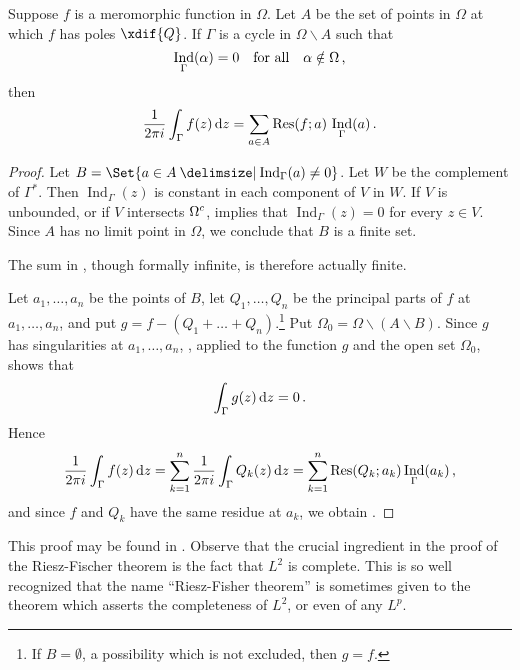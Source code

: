 \documentclass[12pt]{CrispyNotes}
\DeclareMathOperator{\Ind}{Ind}
\DeclareMathOperator{\Res}{Res}
\begin{document}
\begin{theorem}
    Suppose $f$ is a meromorphic function in $\Omega$. Let $A$ be the set of points in $\Omega$ at which $f$ has poles $\xdif{Q}$. If $\Gamma$ is a cycle in $\Omega\smallsetminus A$ such that
        \begin{equation}\label{eq1}
            \Ind_\Gamma (\alpha) = 0 \quad \text{for all} \quad \alpha\notin\Omega\mathc
        \end{equation}
    then
        \begin{equation}\label{eq12}
            \frac{1}{2\pi i}\int_{\Gamma} f(z)\odif{z} = \sum_{a\in A} \Res(f; a)\, \Ind_\Gamma (a)\mathp
        \end{equation}
\end{theorem}
\begin{proof}
    Let $B = \Set{a \in A \given \Ind_{\Gamma}(a)\neq 0}$. Let $W$ be the complement of $\Gamma^*$. Then $\Ind_{\Gamma}(z)$ is constant in each component of $V$ in $W$. If $V$ is unbounded, or if $V$ intersects ${\Omega}^{c}$,  implies that $\Ind_{\Gamma}(z)=0$ for every $z\in V$. Since $A$ has no limit point in $\Omega$, we conclude that $B$ is a finite set.

    The sum in , though formally infinite, is therefore actually finite.

    Let $a_1, \ldots, a_n$ be the points of $B$, let $Q_1, \ldots, Q_n$ be the principal parts of $f$ at $a_1, \ldots, a_n$, and put $g=f-(Q_1+\dots+Q_n)$.\footnote{If $B=\emptyset$, a possibility which is not excluded, then $g=f$.} Put $\Omega_0= \Omega\smallsetminus(A\smallsetminus B)$. Since $g$ has singularities at $a_1, \ldots, a_n$, , applied to the function $g$ and the open set $\Omega_0$, shows that 
        \begin{equation}\label{d}
            \int_{\Gamma} g(z) \odif{z} = 0\mathp
        \end{equation}
    Hence
        \begin{equation}\label{d2}
          \frac{1}{2\pi i}\int_{\Gamma} f(z)\odif{z} = \sum_{k=1}^{n}\frac{1}{2\pi i}\int_{\Gamma} Q_k(z) \odif{z} = \sum_{k=1}^{n}\Res(Q_k; a_k)\Ind_{\Gamma}(a_k)\mathc
        \end{equation}
    and since $f$ and $Q_k$ have the same residue at $a_k$, we obtain .
\end{proof}

This proof may be found in \cite{rudinRealComplexAnalysis1986}. Observe that the crucial ingredient in the proof of the Riesz-Fischer theorem is the fact that $L^2$ is complete. This is so well recognized that the name \enquote{Riesz-Fisher theorem} is sometimes given to the theorem which asserts the completeness of $L^2$, or even of any $L^p$.
\end{document}
